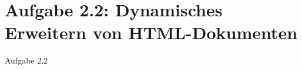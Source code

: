 \section{Aufgabe 2.2: Dynamisches Erweitern von HTML-Dokumenten}
\begin{frame}{Aufgabe 2.2}
\end{frame}
